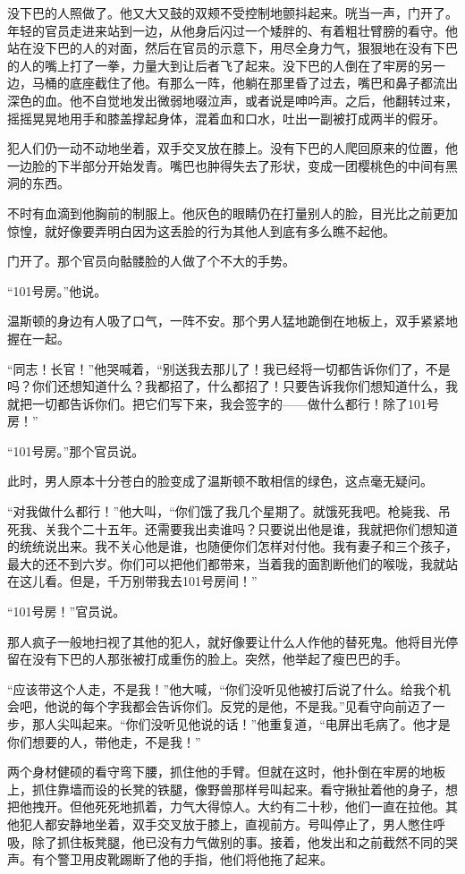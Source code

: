 没下巴的人照做了。他又大又鼓的双颊不受控制地颤抖起来。咣当一声，门开了。年轻的官员走进来站到一边，从他身后闪过一个矮胖的、有着粗壮臂膀的看守。他站在没下巴的人的对面，然后在官员的示意下，用尽全身力气，狠狠地在没有下巴的人的嘴上打了一拳，力量大到让后者飞了起来。没下巴的人倒在了牢房的另一边，马桶的底座截住了他。有那么一阵，他躺在那里昏了过去，嘴巴和鼻子都流出深色的血。他不自觉地发出微弱地啜泣声，或者说是呻吟声。之后，他翻转过来，摇摇晃晃地用手和膝盖撑起身体，混着血和口水，吐出一副被打成两半的假牙。

犯人们仍一动不动地坐着，双手交叉放在膝上。没有下巴的人爬回原来的位置，他一边脸的下半部分开始发青。嘴巴也肿得失去了形状，变成一团樱桃色的中间有黑洞的东西。

不时有血滴到他胸前的制服上。他灰色的眼睛仍在打量别人的脸，目光比之前更加惊惶，就好像要弄明白因为这丢脸的行为其他人到底有多么瞧不起他。

门开了。那个官员向骷髅脸的人做了个不大的手势。

``101号房。''他说。

温斯顿的身边有人吸了口气，一阵不安。那个男人猛地跪倒在地板上，双手紧紧地握在一起。

``同志！长官！''他哭喊着，``别送我去那儿了！我已经将一切都告诉你们了，不是吗？你们还想知道什么？我都招了，什么都招了！只要告诉我你们想知道什么，我就把一切都告诉你们。把它们写下来，我会签字的------做什么都行！除了101号房！''

``101号房。''那个官员说。

此时，男人原本十分苍白的脸变成了温斯顿不敢相信的绿色，这点毫无疑问。

``对我做什么都行！''他大叫，``你们饿了我几个星期了。就饿死我吧。枪毙我、吊死我、关我个二十五年。还需要我出卖谁吗？只要说出他是谁，我就把你们想知道的统统说出来。我不关心他是谁，也随便你们怎样对付他。我有妻子和三个孩子，最大的还不到六岁。你们可以把他们都带来，当着我的面割断他们的喉咙，我就站在这儿看。但是，千万别带我去101号房间！''

``101号房！''官员说。

那人疯子一般地扫视了其他的犯人，就好像要让什么人作他的替死鬼。他将目光停留在没有下巴的人那张被打成重伤的脸上。突然，他举起了瘦巴巴的手。

``应该带这个人走，不是我！''他大喊，``你们没听见他被打后说了什么。给我个机会吧，他说的每个字我都会告诉你们。反党的是他，不是我。''见看守向前迈了一步，那人尖叫起来。``你们没听见他说的话！''他重复道，``电屏出毛病了。他才是你们想要的人，带他走，不是我！''

两个身材健硕的看守弯下腰，抓住他的手臂。但就在这时，他扑倒在牢房的地板上，抓住靠墙而设的长凳的铁腿，像野兽那样号叫起来。看守揪扯着他的身子，想把他拽开。但他死死地抓着，力气大得惊人。大约有二十秒，他们一直在拉他。其他犯人都安静地坐着，双手交叉放于膝上，直视前方。号叫停止了，男人憋住呼吸，除了抓住板凳腿，他已没有力气做别的事。接着，他发出和之前截然不同的哭声。有个警卫用皮靴踢断了他的手指，他们将他拖了起来。

